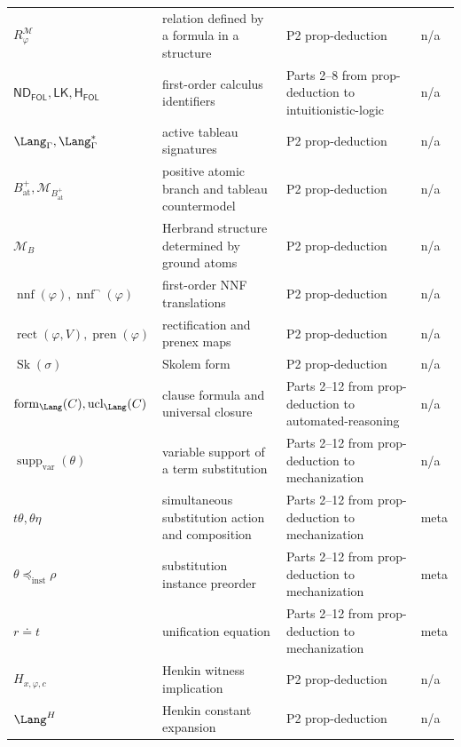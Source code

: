 \begin{longtable}{@{}p{}p{}p{}p{}@{}}
\(R^{\mathcal M}_{\varphi}\) & relation defined by a formula in a structure & P2 prop-\allowbreak{}deduction & n/a \\
\(\mathsf{ND}_{\mathsf{FOL}},\allowbreak \mathsf{LK},\allowbreak \mathsf H_{\mathsf{FOL}}\) & first-order calculus identifiers & Parts 2--8 from prop-\allowbreak{}deduction to intuitionistic-\allowbreak{}logic & n/a \\
\(\Lang_{\Gamma},\allowbreak \Lang_{\Gamma}^{*}\) & active tableau signatures & P2 prop-\allowbreak{}deduction & n/a \\
\(B^{+}_{\mathrm{at}},\allowbreak \mathcal M_{B^{+}_{\mathrm{at}}}\) & positive atomic branch and tableau countermodel & P2 prop-\allowbreak{}deduction & n/a \\
\(\mathcal M_B\) & Herbrand structure determined by ground atoms & P2 prop-\allowbreak{}deduction & n/a \\
\(\operatorname{nnf}(\varphi),\allowbreak \operatorname{nnf}^{\neg}(\varphi)\) & first-order NNF translations & P2 prop-\allowbreak{}deduction & n/a \\
\(\operatorname{rect}(\varphi,\allowbreak V),\allowbreak \operatorname{pren}(\varphi)\) & rectification and prenex maps & P2 prop-\allowbreak{}deduction & n/a \\
\(\operatorname{Sk}(\sigma)\) & Skolem form & P2 prop-\allowbreak{}deduction & n/a \\
\(\operatorname{form}_{\Lang}(C),\allowbreak \operatorname{ucl}_{\Lang}(C)\) & clause formula and universal closure & Parts 2--12 from prop-\allowbreak{}deduction to automated-\allowbreak{}reasoning & n/a \\
\(\operatorname{supp}_{\mathrm{var}}(\theta)\) & variable support of a term substitution & Parts 2--12 from prop-\allowbreak{}deduction to mechanization & n/a \\
\(t\theta,\allowbreak \theta\eta\) & simultaneous substitution action and composition & Parts 2--12 from prop-\allowbreak{}deduction to mechanization & meta \\
\(\theta\preceq_{\mathrm{inst}}\rho\) & substitution instance preorder & Parts 2--12 from prop-\allowbreak{}deduction to mechanization & meta \\
\(r\doteq t\) & unification equation & Parts 2--12 from prop-\allowbreak{}deduction to mechanization & meta \\
\(H_{x,\varphi,c}\) & Henkin witness implication & P2 prop-\allowbreak{}deduction & n/a \\
\(\Lang^H\) & Henkin constant expansion & P2 prop-\allowbreak{}deduction & n/a \\

\end{longtable}

